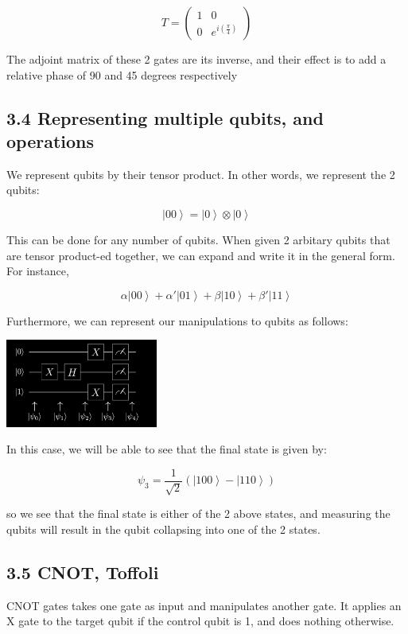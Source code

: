 \documentclass[10pt,oneside,a4paper]{article}
\newcommand{\qb}[1]{\left| #1 \right\rangle}
\begin{document}
\[
    T = \begin{pmatrix} 1 & 0 \\ 0 & e^{i \left(\frac{\pi}{4}\right)} \end{pmatrix}
\]

The adjoint matrix of these 2 gates are its inverse, and their effect is to add a relative phase of 90 and 45 degrees respectively

\subsection*{3.4 Representing multiple qubits, and operations}

We represent qubits by their tensor product. In other words, we represent the 2 qubits: 

\[ 
    \qb{00} = \qb{0} \otimes \qb{0}
\]


This can be done for any number of qubits. When given 2 arbitary qubits that are tensor product-ed together, we can expand and write it in the general form. For instance, 

\[
\alpha\qb{00} + \alpha'\qb{01} + \beta\qb{10} + \beta'\qb{11}
\]

Furthermore, we can represent our manipulations to qubits as follows: 

\begin{center}
\includegraphics[width=5cm]{2}
\end{center}

In this case, we will be able to see that the final state is given by: 

\[ 
    \psi_3 = \frac{1}{\sqrt{2}} \left( \qb{100} - \qb{110} \right)
\]

so we see that the final state is either of the 2 above states, and measuring the qubits will result in the qubit collapsing into one of the 2 states. 

\subsection*{3.5 CNOT, Toffoli}

CNOT gates takes one gate as input and manipulates another gate. It applies an X gate to the target qubit if the control qubit is 1, and does nothing otherwise. 
\end{document}

